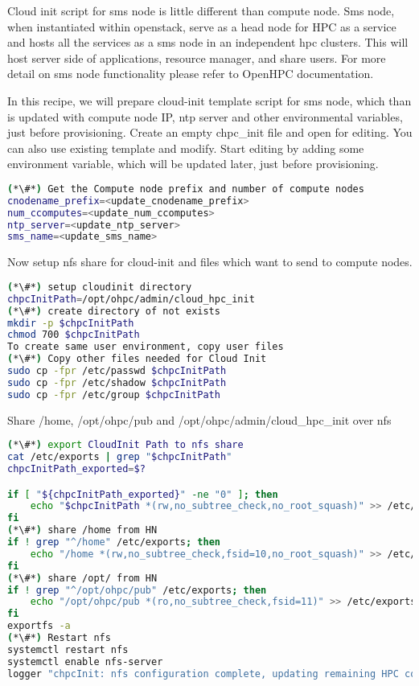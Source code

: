Cloud init script for sms node is little different than compute node. Sms node, when instantiated within openstack, serve as a head node for HPC as a service and hosts all the services as a sms node in an independent hpc clusters. This will host server side of applications, resource manager, and share users. For more detail on sms node functionality please refer to OpenHPC documentation.

In this recipe, we will prepare cloud-init template script for sms node, which than is updated with compute node IP, ntp server and other environmental variables, just before provisioning. 
Create an empty chpc\_init file and open for editing. You can also use existing template and modify. Start editing by adding some environment variable, which will be updated later, just before provisioning.


\begin{lstlisting}[language=bash,keywords={}]
(*\#*) Get the Compute node prefix and number of compute nodes
cnodename_prefix=<update_cnodename_prefix>
num_ccomputes=<update_num_ccomputes>
ntp_server=<update_ntp_server>
sms_name=<update_sms_name>
\end{lstlisting}

Now setup nfs share for cloud-init and files which want to send to compute nodes.


\begin{lstlisting}[language=bash,keywords={}]
(*\#*) setup cloudinit directory
chpcInitPath=/opt/ohpc/admin/cloud_hpc_init
(*\#*) create directory of not exists
mkdir -p $chpcInitPath
chmod 700 $chpcInitPath
To create same user environment, copy user files 
(*\#*) Copy other files needed for Cloud Init
sudo cp -fpr /etc/passwd $chpcInitPath
sudo cp -fpr /etc/shadow $chpcInitPath
sudo cp -fpr /etc/group $chpcInitPath
\end{lstlisting}

Share /home, /opt/ohpc/pub and /opt/ohpc/admin/cloud\_hpc\_init over nfs

\begin{lstlisting}[language=bash,keywords={}]
(*\#*) export CloudInit Path to nfs share
cat /etc/exports | grep "$chpcInitPath"
chpcInitPath_exported=$?

if [ "${chpcInitPath_exported}" -ne "0" ]; then
    echo "$chpcInitPath *(rw,no_subtree_check,no_root_squash)" >> /etc/exports
fi
(*\#*) share /home from HN
if ! grep "^/home" /etc/exports; then
    echo "/home *(rw,no_subtree_check,fsid=10,no_root_squash)" >> /etc/exports
fi
(*\#*) share /opt/ from HN
if ! grep "^/opt/ohpc/pub" /etc/exports; then
    echo "/opt/ohpc/pub *(ro,no_subtree_check,fsid=11)" >> /etc/exports
fi
exportfs -a
(*\#*) Restart nfs
systemctl restart nfs
systemctl enable nfs-server
logger "chpcInit: nfs configuration complete, updating remaining HPC configuration" 
\end{lstlisting}

